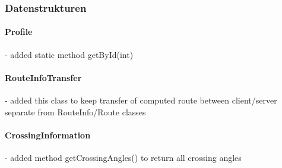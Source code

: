 \subsubsection{Datenstrukturen}

\paragraph{Profile}
- added static method getById(int)

\paragraph{RouteInfoTransfer}
- added this class to keep transfer of computed route between client/server separate from RouteInfo/Route classes

\paragraph{CrossingInformation}
- added method getCrossingAngles() to return all crossing angles
